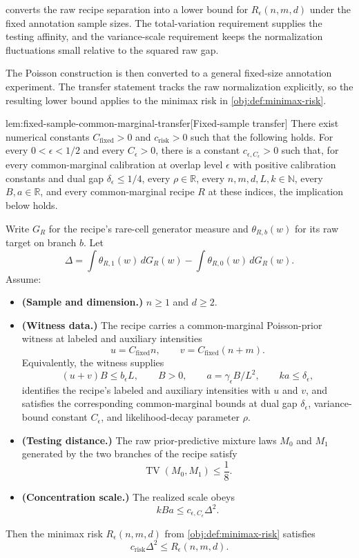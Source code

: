  converts the raw recipe separation into a lower bound for \(R_\epsilon(n,m,d)\) under the fixed annotation sample sizes. The total-variation requirement supplies the testing affinity, and the variance-scale requirement keeps the normalization fluctuations small relative to the squared raw gap.

The Poisson construction is then converted to a general fixed-size annotation experiment. The transfer statement tracks the raw normalization explicitly, so the resulting lower bound applies to the minimax risk in \cref{obj:def:minimax-risk}.

\begin{lemmav}{lem:fixed-sample-common-marginal-transfer}[Fixed-sample transfer]
There exist numerical constants \(C_{\mathrm{fixed}}>0\) and \(c_{\mathrm{risk}}>0\) such that the following holds.  For every \(0<\epsilon<1/2\) and every \(C_\epsilon>0\), there is a constant \(c_{\epsilon,C_\epsilon}>0\) such that, for every common-marginal calibration at overlap level \(\epsilon\) with positive calibration constants and dual gap \(\delta_\epsilon\le 1/4\), every \(\rho\in\mathbb R\), every \(n,m,d,L,k\in\mathbb N\), every \(B,a\in\mathbb R\), and every common-marginal recipe \(R\) at these indices, the implication below holds.

Write \(G_R\) for the recipe's rare-cell generator measure and \(\theta_{R,b}(w)\) for its raw target on branch \(b\).  Let
\[
\Delta
=
\int \theta_{R,1}(w)\,dG_R(w)
-
\int \theta_{R,0}(w)\,dG_R(w).
\]
Assume:
\begin{itemize}
\item \textbf{(Sample and dimension.)} \(n\ge 1\) and \(d\ge 2\).
\item \textbf{(Witness data.)} The recipe carries a common-marginal Poisson-prior witness at labeled and auxiliary intensities
\[
u=C_{\mathrm{fixed}}n,
\qquad
v=C_{\mathrm{fixed}}(n+m).
\]
Equivalently, the witness supplies
\[
(u+v)B\le b_\epsilon L,
\qquad
B>0,
\qquad
a=\gamma_\epsilon B/L^2,
\qquad
ka\le \delta_\epsilon,
\]
identifies the recipe's labeled and auxiliary intensities with \(u\) and \(v\), and satisfies the corresponding common-marginal bounds at dual gap \(\delta_\epsilon\), variance-bound constant \(C_\epsilon\), and likelihood-decay parameter \(\rho\).
\item \textbf{(Testing distance.)} The raw prior-predictive mixture laws \(M_0\) and \(M_1\) generated by the two branches of the recipe satisfy
\[
\operatorname{TV}(M_0,M_1)\le \frac18 .
\]
\item \textbf{(Concentration scale.)} The realized scale obeys
\[
kBa\le c_{\epsilon,C_\epsilon}\Delta^2 .
\]
\end{itemize}
Then the minimax risk \(R_\epsilon(n,m,d)\) from \cref{obj:def:minimax-risk} satisfies
\[
c_{\mathrm{risk}}\Delta^2
\le
R_\epsilon(n,m,d).
\]
\end{lemmav}

